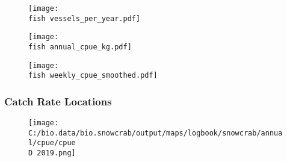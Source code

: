 \documentclass{beamer}
\begin{document}
	
	\begin{frame}
		\begin{figure}
			
			\centerline{\texttt{[image: \\fish vessels\_per\_year.pdf]}}
			
		\end{figure}
	\end{frame}
	
	
	
	\begin{frame}
		\begin{figure}
			
			\vspace*{-.25cm}
			\centerline{\texttt{[image: \\fish annual\_cpue\_kg.pdf]}}
			
		\end{figure}
	\end{frame}
	
	
	
	\begin{frame}
		\begin{figure}
			
			\vspace*{-.5cm}
			\centerline{\texttt{[image: \\fish weekly\_cpue\_smoothed.pdf]}}
			
		\end{figure}
	\end{frame}
	
	
	\begin{frame}
		\frametitle{Catch Rate Locations}
		\begin{figure}
			
			\centerline{\texttt{[image: C:/bio.data/bio.snowcrab/output/maps/logbook/snowcrab/annual/cpue/cpue\\D 2019.png]}}
			
		\end{figure}
	\end{frame}
	
\end{document}
